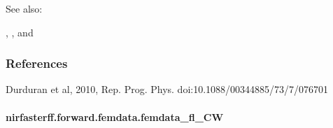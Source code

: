 \documentclass[letterpaper,10pt,english]{sphinxmanual}
\begin{document}
\begin{fulllineitems}
\begin{sphinxseealso}{See also:}

\sphinxAtStartPar
{\hyperref[\detokenize{_autosummary/nirfasterff.math.gen_mass_matrix:nirfasterff.math.gen_mass_matrix}]{}}, {\hyperref[\detokenize{_autosummary/nirfasterff.math.gen_sources:nirfasterff.math.gen_sources}]{}}, and {\hyperref[\detokenize{_autosummary/nirfasterff.math.get_field_CW:nirfasterff.math.get_field_CW}]{}}


\end{sphinxseealso}

\subsubsection*{References}

\sphinxAtStartPar
Durduran et al, 2010, Rep. Prog. Phys. doi:10.1088/0034\sphinxhyphen{}4885/73/7/076701

\end{fulllineitems}


\sphinxstepscope


\paragraph{nirfasterff.forward.femdata.femdata\_fl\_CW}
\label{\detokenize{_autosummary/nirfasterff.forward.femdata.femdata_fl_CW:nirfasterff-forward-femdata-femdata-fl-cw}}\label{\detokenize{_autosummary/nirfasterff.forward.femdata.femdata_fl_CW::doc}}
\end{document}
